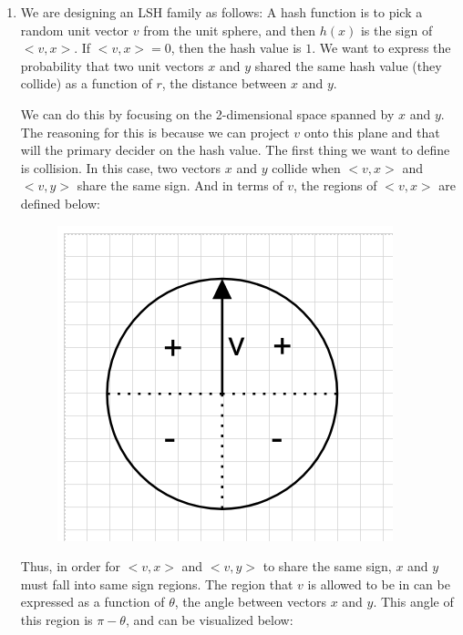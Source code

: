 \documentclass[11pt]{article}
\theoremstyle{definition}
\theoremstyle{case}
\theoremstyle{theorem}
\begin{document}
\begin{enumerate}[label=(\alph*)]

\item We are designing an LSH family as follows: A hash function is to pick a random unit vector $v$ from the unit sphere, and then $h(x)$ is the sign of 
$<v,x>$. If $<v,x> = 0$, then the hash value is $1$. We want to express the probability that two unit vectors $x$ and $y$ shared the same hash value (they collide)
as a function of $r$, the distance between $x$ and $y$. 

We can do this by focusing on the 2-dimensional space spanned by $x$ and $y$. The reasoning for this is because we can project $v$ onto this plane and that 
will the primary decider on the hash value. The first thing we want to define is collision. In this case, two vectors $x$ and $y$ collide when $<v,x>$ and $<v,y>$
share the same sign. And in terms of $v$, the regions of $<v,x>$ are defined below: 

\begin{figure}[h!]
  \centering
  \includegraphics[totalheight=6cm]{images/v-circle.png}
\end{figure}

Thus, in order for $<v,x>$ and $<v,y>$ to share the same sign, $x$ and $y$ must fall into same sign regions. The region that $v$ is allowed to be in 
can be expressed as a function of $\theta$, the angle between vectors $x$ and $y$. This angle of this region is $\pi - \theta$, and can be visualized below:


\end{enumerate}
\end{document}

